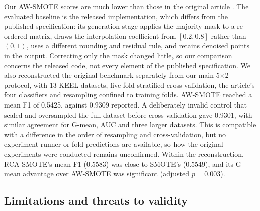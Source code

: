 \documentclass[preprint,nopreprintline]{elsarticle}
\theoremstyle{plain}
\theoremstyle{definition}
\begin{document}
Our AW-SMOTE scores are much lower than those in the original article \cite{yan2026awsmote}. The evaluated baseline is the released implementation, which differs from the published specification: its generation stage applies the majority mask to a re-ordered matrix, draws the interpolation coefficient from $[0.2,0.8]$ rather than $(0,1)$, uses a different rounding and residual rule, and retains denoised points in the output. Correcting only the mask changed little, so our comparison concerns the released code, not every element of the published specification. We also reconstructed the original benchmark separately from our main 5$\times$2 protocol, with 13 KEEL datasets, five-fold stratified cross-validation, the article's four classifiers and resampling confined to training folds. AW-SMOTE reached a mean F1 of 0.5425, against 0.9309 reported. A deliberately invalid control that scaled and oversampled the full dataset before cross-validation \cite{santos2018cross,kaufman2012leakage} gave 0.9301, with similar agreement for G-mean, AUC and three larger datasets. This is compatible with a difference in the order of resampling and cross-validation, but no experiment runner or fold predictions are available, so how the original experiments were conducted remains unconfirmed. Within the reconstruction, RCA-SMOTE's mean F1 (0.5583) was close to SMOTE's (0.5549), and its G-mean advantage over AW-SMOTE was significant (adjusted $p=0.003$). 

\subsection{Limitations and threats to validity}\label{sec:limitations}
\end{document}
